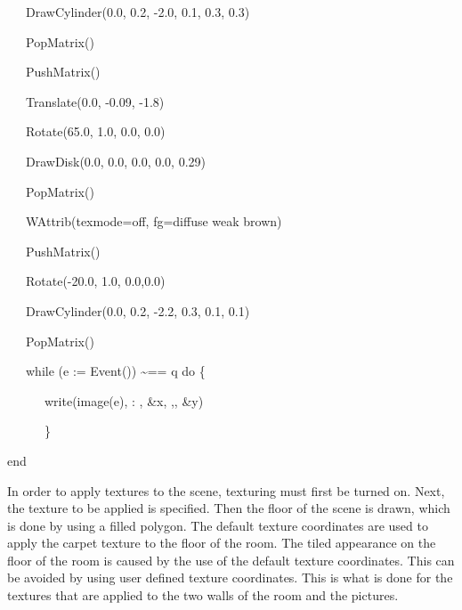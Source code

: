 \documentclass[letterpaper]{article}
\begin{document}
{{\sffamily
\ \ \ DrawCylinder(0.0, 0.2, -2.0, 0.1, 0.3, 0.3)}

{\sffamily
\ \ \ PopMatrix()}


\bigskip

{\sffamily
\ \ \ PushMatrix()}

{\sffamily
\ \ \ Translate(0.0, -0.09, -1.8)}

{\sffamily
\ \ \ Rotate(65.0, 1.0, 0.0, 0.0)}

{\sffamily
\ \ \ DrawDisk(0.0, 0.0, 0.0, 0.0, 0.29) }

{\sffamily
\ \ \ PopMatrix()}


\bigskip

{\sffamily
\ \ \ WAttrib({\textquotedbl}texmode=off{\textquotedbl}, {\textquotedbl}fg=diffuse weak brown{\textquotedbl})}

{\sffamily
\ \ \ PushMatrix()}

{\sffamily
\ \ \ Rotate(-20.0, 1.0, 0.0,0.0)}

{\sffamily
\ \ \ DrawCylinder(0.0, 0.2, -2.2, 0.3, 0.1, 0.1)}

{\sffamily
\ \ \ PopMatrix()}

{\sffamily
\ \ \ while (e := Event()) \~{}== {\textquotedbl}q{\textquotedbl} do \{}

{\sffamily
\ \ \ \ \ \ write(image(e), {\textquotedbl}: {\textquotedbl}, \&x, {\textquotedbl},{\textquotedbl}, \&y)}

{\sffamily
\ \ \ \ \ \ \}}

{\sffamily
end}


\bigskip

{
In order to apply textures to the scene, texturing must first be turned on. Next, the texture to be applied is
specified. Then the floor of the scene is drawn, which is done by using a filled polygon. The default texture
coordinates are used to apply the carpet texture to the floor of the room. The tiled appearance on the floor of the
room is caused by the use of the default texture coordinates. This can be avoided by using user defined texture
coordinates. This is what is done for the textures that are applied to the two walls of the room and the pictures. }

}
\end{document}
